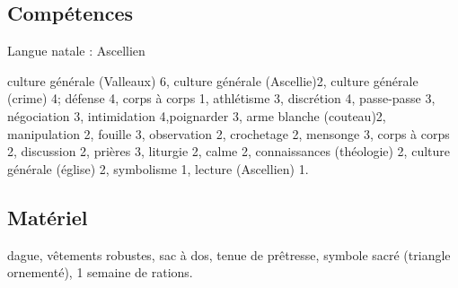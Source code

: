 \documentclass[10pt,a4paper]{article}
\begin{document}
\subsection{Compétences}
Langue natale : Ascellien

culture générale (Valleaux) 6, culture générale (Ascellie)2, culture générale (crime) 4; défense 4, corps à corps 1, athlétisme 3, discrétion 4, passe-passe 3, négociation 3, intimidation 4,poignarder 3, arme blanche (couteau)2, manipulation 2, fouille 3, observation 2, crochetage 2, mensonge 3, corps à corps 2, discussion 2, prières 3, liturgie 2, calme 2, connaissances (théologie) 2, culture générale (église) 2, symbolisme 1, lecture (Ascellien) 1.
\subsection{Matériel}
dague, vêtements robustes, sac à dos, tenue de prêtresse, symbole sacré (triangle ornementé), 1 semaine de rations.
\end{document}
